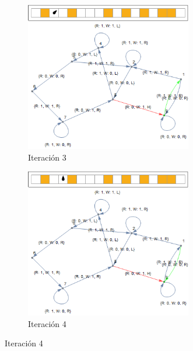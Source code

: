 \documentclass[10pt,a4paper]{article}
\begin{document}
\begin{figure}[htb!]
\begin{subfigure}[b]{0.475\textwidth}
            \includegraphics[width=0.8\textwidth]{../img/xn1/3}
            \caption{Iteración 3}
        \end{subfigure}
        \hfill
        \begin{subfigure}[b]{0.475\textwidth}
            \centering 
            \includegraphics[width=0.8\textwidth]{../img/xn1/4}
            \caption{Iteración 4}
        \end{subfigure}
        

\end{figure}
\end{document}

